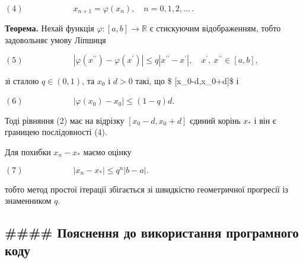 \documentclass[11pt]{article}
\begin{document}
\((4)\qquad\qquad\qquad x_{n+1} = \varphi(x_n), \quad n=0,1,2, \dots\,.\)

\textbf{Теорема.} Нехай функція \(\varphi: [a,b]\to \mathbb{R}\) є
стискуючим відображенням, тобто задовольняє умову Ліпшиця

\((5)\qquad\qquad\qquad |\varphi(x^{\prime\prime}) - \varphi(x^{\prime})| \leqslant q|x^{\prime\prime} - x^{\prime}|,\quad x^{\prime}, \ x^{\prime\prime} \in [a,b],\)

зі сталою \(q\in (0,1)\), та \(x_0\) і \(d>0\) такі, що \$
{[}x\_0-d,x\_0+d{]}\subset [a,b]\$ і

\((6)\qquad\qquad\qquad |\varphi(x_0)-x_0| \leqslant (1-q)d\).

Тоді рівняння (2) має на відрізку \([x_0-d,x_0+d]\) єдиний корінь
\(x_*\) і він є границею послідовності (4).

Для похибки \(x_{n} - x_*\) маємо оцінку

\((7)\qquad\qquad\qquad |x_{n} - x_*|\leqslant q^{n} |b-a|.\)

тобто метод простої ітерації збігається зі швидкістю геометричної
прогресії із знаменником \(q\).

    \hypertarget{ux43fux43eux44fux441ux43dux435ux43dux43dux44f-ux434ux43e-ux432ux438ux43aux43eux440ux438ux441ux442ux430ux43dux43dux44f-ux43fux440ux43eux433ux440ux430ux43cux43dux43eux433ux43e-ux43aux43eux434ux443}{%
\subsection{\#\#\#\# Пояснення до використання програмного
коду}\label{ux43fux43eux44fux441ux43dux435ux43dux43dux44f-ux434ux43e-ux432ux438ux43aux43eux440ux438ux441ux442ux430ux43dux43dux44f-ux43fux440ux43eux433ux440ux430ux43cux43dux43eux433ux43e-ux43aux43eux434ux443}}
\end{document}

